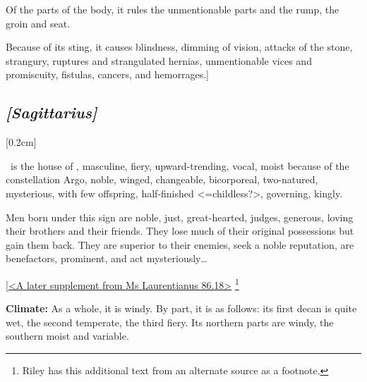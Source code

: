Of the parts of the body, it rules the unmentionable parts and the rump, the groin and seat. 

Because of its sting, it causes blindness, dimming of vision, attacks of the stone, strangury, ruptures and strangulated hernias, unmentionable vices and promiscuity, fistulas, cancers, and hemorrages.]

\secbr
\subsection{\textit{[Sagittarius]}}
[0.2cm]

 \Sagittarius\, is the house of \Jupiter,  masculine,  fiery, upward-trending,  vocal, moist because of the constellation Argo, noble, winged, changeable,  bicorporeal, two-natured, mysterious, with few offspring, half-finished <=childless?>, governing, kingly. 

Men born under this sign are noble, just, great-hearted, judges, generous, loving their brothers and their friends. They lose much of their original possessions but gain them back. They are superior to their enemies, seek a noble reputation, are benefactors, prominent, and act mysteriously\ldots

\noindent
[\underline{<A later supplement from Ms Laurentianus 86.18>}
\footnote{Riley has this additional text from an alternate source as a footnote.}  

\textbf{Climate:} As a whole, it is windy. By part, it is as follows: its first decan is quite wet, the second temperate, the third fiery. Its northern parts are windy, the southern moist and variable. 

